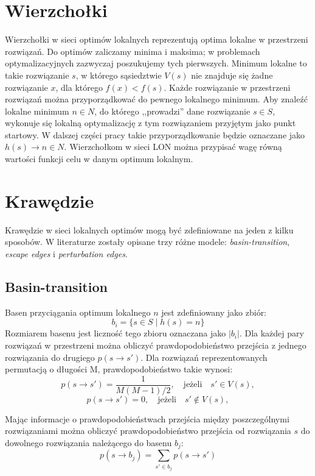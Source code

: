 \section{Wierzchołki}
Wierzchołki w sieci optimów lokalnych reprezentują optima lokalne w przestrzeni rozwiązań.
Do optimów zaliczamy minima i maksima; w problemach optymalizacyjnych zazwyczaj poszukujemy tych pierwszych.
Minimum lokalne to takie rozwiązanie $s$, w którego sąsiedztwie $V(s)$ nie znajduje się żadne rozwiązanie $x$, dla którego $f(x) < f(s)$.
Każde rozwiązanie w przestrzeni rozwiązań można przyporządkować do pewnego lokalnego minimum.
Aby znaleźć lokalne minimum $n \in{N}$, do którego ,,prowadzi'' dane rozwiązanie $s\in{S}$, wykonuje się lokalną optymalizację
z tym rozwiązaniem przyjętym jako punkt startowy.
W dalszej części pracy takie przyporządkowanie będzie oznaczane jako $h(s) \rightarrow n\in{N}$.
Wierzchołkom w sieci LON można przypisać wagę równą wartości funkcji celu w danym optimum lokalnym.

\section{Krawędzie}
Krawędzie w sieci lokalnych optimów mogą być zdefiniowane na jeden z kilku sposobów.
W literaturze \cite{DBLP:journals/corr/OchoaVDT14} \cite{DBLP:conf/gecco/TeixeiraP22} zostały opisane trzy różne modele:
\textit{basin-transition}, \textit{escape edges} i \textit{perturbation edges}.

\subsection{Basin-transition}
Basen przyciągania optimum lokalnego $n$ jest zdefiniowany jako zbiór:
$$b_i = \{s\in{S} \mid h(s) = n\}$$
Rozmiarem basenu jest liczność tego zbioru oznaczana jako $|b_i|$.
Dla każdej pary rozwiązań w przestrzeni można obliczyć prawdopodobieństwo przejścia z jednego rozwiązania do drugiego $p(s \rightarrow s')$.
Dla rozwiązań reprezentowanych permutacją o długości M, prawdopodobieństwo takie wynosi:
$$p(s \rightarrow s') = \frac{1}{M(M-1)/2}, \quad \text{jeżeli} \quad s'\in{V(s)},$$
$$p(s \rightarrow s') = 0, \quad \text{jeżeli} \quad s'\notin{V(s)},$$

Mając informacje o prawdopodobieństwach przejścia między poszczególnymi rozwiązaniami można obliczyć prawdopodobieństwo
przejścia od rozwiązania $s$ do dowolnego rozwiązania należącego do basenu $b_j$:
$$p(s \rightarrow b_j) = \sum_{s'\in{b_j}} p(s \rightarrow s')$$

